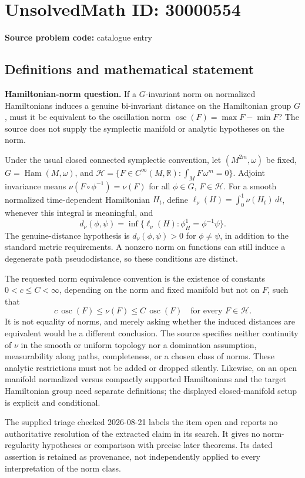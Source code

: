 \documentclass[11pt]{article}
\newcommand{\R}{\mathbb{R}}
\begin{document}
\section*{UnsolvedMath ID: 30000554}
\textbf{Source problem code:} catalogue entry
\subsection{Definitions and mathematical statement}
\textbf{Hamiltonian-norm question.} If a \(G\)-invariant norm on normalized Hamiltonians induces a genuine bi-invariant distance on the Hamiltonian group \(G\), must it be equivalent to the oscillation norm \(\operatorname{osc}(F)=\max F-\min F\)? The source does not supply the symplectic manifold or analytic hypotheses on the norm.\par Under the usual closed connected symplectic convention, let \((M^{2m},\omega)\) be fixed, \(G=\operatorname{Ham}(M,\omega)\), and \(\mathcal H=\{F\in C^\infty(M,\R):\int_MF\,\omega^m=0\}\). Adjoint invariance means \(\nu(F\circ\phi^{-1})=\nu(F)\) for all \(\phi\in G\), \(F\in\mathcal H\). For a smooth normalized time-dependent Hamiltonian \(H_t\), define \(\ell_\nu(H)=\int_0^1\nu(H_t)\,dt\), whenever this integral is meaningful, and\[d_\nu(\phi,\psi)=\inf\{\ell_\nu(H):\phi_H^1=\phi^{-1}\psi\}.\] The genuine-distance hypothesis is \(d_\nu(\phi,\psi)>0\) for \(\phi\ne\psi\), in addition to the standard metric requirements. A nonzero norm on functions can still induce a degenerate path pseudodistance, so these conditions are distinct.\par The requested norm equivalence convention is the existence of constants \(0<c\le C<\infty\), depending on the norm and fixed manifold but not on \(F\), such that\[c\,\operatorname{osc}(F)\le\nu(F)\le C\,\operatorname{osc}(F)\quad\text{for every }F\in\mathcal H.\] It is not equality of norms, and merely asking whether the induced distances are equivalent would be a different conclusion. The source specifies neither continuity of \(\nu\) in the smooth or uniform topology nor a domination assumption, measurability along paths, completeness, or a chosen class of norms. These analytic restrictions must not be added or dropped silently. Likewise, on an open manifold normalized versus compactly supported Hamiltonians and the target Hamiltonian group need separate definitions; the displayed closed-manifold setup is explicit and conditional.\par The supplied triage checked 2026-08-21 labels the item open and reports no authoritative resolution of the extracted claim in its search. It gives no norm-regularity hypotheses or comparison with precise later theorems. Its dated assertion is retained as provenance, not independently applied to every interpretation of the norm class.
\end{document}
